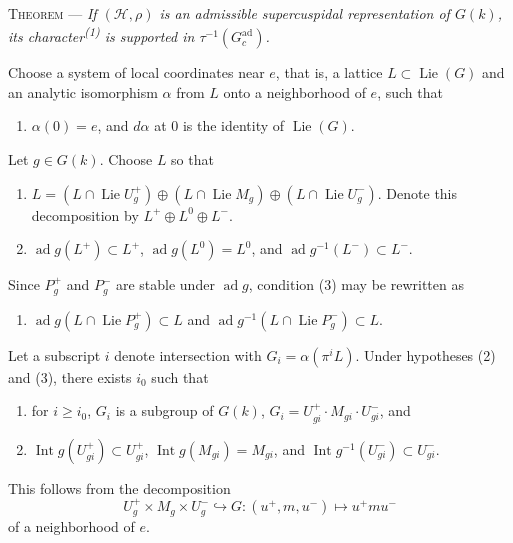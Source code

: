 \documentclass[11pt,a4paper]{article}
\DeclareMathOperator{\Lie}{Lie}
\DeclareMathOperator{\Int}{Int}
\DeclareMathOperator{\ad}{ad}
\newcommand{\DStatement}[3]{%
  \phantomsection\pdfbookmark[2]{#2}{#1}%
  \medskip\noindent\textsc{#2} --- \textit{#3}\par\medskip
}
\begin{document}
\DStatement{theorem}{Theorem}{If \((\mathscr{H},\rho)\) is an admissible
supercuspidal representation of \(G(k)\), its
\mbox{character\textsuperscript{(1)}} is supported in
\(\tau^{-1}(G_c^{\mathrm{ad}})\).}

Choose a system of local coordinates near \(e\), that is, a lattice
\(L\subset\Lie(G)\) and an analytic isomorphism \(\alpha\) from \(L\) onto a
neighborhood of \(e\), such that

\begin{enumerate}[label=(\arabic*)]
\item \(\alpha(0)=e\), and \(d\alpha\) at \(0\) is the identity of \(\Lie(G)\).
\end{enumerate}

Let \(g\in G(k)\). Choose \(L\) so that

\begin{enumerate}[label=(\arabic*),start=2]
\item
  \(L=(L\cap\Lie U_g^{+})\oplus(L\cap\Lie M_g)\oplus
  (L\cap\Lie U_g^{-})\). Denote this decomposition by
  \(L^{+}\oplus L^{0}\oplus L^{-}\).
\item
  \(\ad g(L^{+})\subset L^{+}\), \(\ad g(L^{0})=L^{0}\), and
  \(\ad g^{-1}(L^{-})\subset L^{-}\).
\end{enumerate}

Since \(P_g^{+}\) and \(P_g^{-}\) are stable under \(\ad g\), condition (3)
may be rewritten as

\begin{enumerate}
\item[(3')]
  \(\ad g(L\cap\Lie P_g^{+})\subset L\) and
  \(\ad g^{-1}(L\cap\Lie P_g^{-})\subset L\).
\end{enumerate}

Let a subscript \(i\) denote intersection with
\(G_i=\alpha(\pi^{i}L)\). Under hypotheses (2) and (3), there exists \(i_0\)
such that

\begin{enumerate}[label=(\arabic*),start=4]
\item for \(i\geq i_0\), \(G_i\) is a subgroup of \(G(k)\),
  \(G_i=U_{gi}^{+}\cdot M_{gi}\cdot U_{gi}^{-}\), and
\item \(\Int g(U_{gi}^{+})\subset U_{gi}^{+}\),
  \(\Int g(M_{gi})=M_{gi}\), and
  \(\Int g^{-1}(U_{gi}^{-})\subset U_{gi}^{-}\).
\end{enumerate}

This follows from the decomposition
\[
  U_g^{+}\times M_g\times U_g^{-}\hookrightarrow G:
  (u^{+},m,u^{-})\longmapsto u^{+}mu^{-}
\]
of a neighborhood of \(e\).
\end{document}
